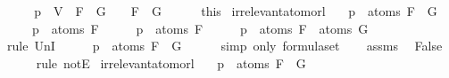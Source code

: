 \begin{isabellebody}
\ \ \isamarkupfalse%
\ \isamarkupfalse%
\ {\isachardoublequoteopen}{\isasymA}{\isacharparenleft}p\ {\isacharcolon}{\isacharequal}\ V{\isacharparenright}\ {\isasymTurnstile}\ {\isacharparenleft}F\ \isactrlbold {\isasymand}\ G{\isacharparenright}\ {\isasymlongleftrightarrow}\ {\isasymA}\ {\isasymTurnstile}\ {\isacharparenleft}F\ \isactrlbold {\isasymand}\ G{\isacharparenright}{\isachardoublequoteclose}\isanewline
\ \ \ \ \isamarkupfalse%
\ this\isanewline
{}\isamarkupfalse%
%
\endisatagproof
{\isafoldproof}%
%
\isadelimproof
\isanewline
%
\endisadelimproof
\isanewline
{}\isamarkupfalse%
\ irrelevant{\isacharunderscore}atom{\isacharunderscore}or{\isacharunderscore}l{}{\isacharcolon}\isanewline
\ \ \ {\isachardoublequoteopen}p\ {\isasymnotin}\ atoms\ {\isacharparenleft}F\ \isactrlbold {\isasymor}\ G{\isacharparenright}{\isachardoublequoteclose}\isanewline
\ \ \ \ \ {\isachardoublequoteopen}p\ {\isasymnotin}\ atoms\ F{\isachardoublequoteclose}\isanewline
%
\isadelimproof
%
\endisadelimproof
%
\isatagproof
{}\isamarkupfalse%
\ \isanewline
\ \ \isamarkupfalse%
\ {\isachardoublequoteopen}p\ {\isasymin}\ atoms\ F{\isachardoublequoteclose}\isanewline
\ \ \isamarkupfalse%
\ \isamarkupfalse%
\ {\isachardoublequoteopen}p\ {\isasymin}\ atoms\ F\ {\isasymunion}\ atoms\ G{\isachardoublequoteclose}\isanewline
\ \ \ \ \isamarkupfalse%
\ {\isacharparenleft}rule\ UnI{}{\isacharparenright}\isanewline
\ \ \isamarkupfalse%
\ \isamarkupfalse%
\ {\isachardoublequoteopen}p\ {\isasymin}\ atoms\ {\isacharparenleft}F\ \isactrlbold {\isasymor}\ G{\isacharparenright}{\isachardoublequoteclose}\isanewline
\ \ \ \ \isamarkupfalse%
\ {\isacharparenleft}simp\ only{\isacharcolon}\ formula{\isachardot}set{\isacharparenleft}{}{\isacharparenright}{\isacharparenright}\isanewline
\ \ \isamarkupfalse%
\ assms\ \isamarkupfalse%
\ False\ \isanewline
\ \ \ \ \isamarkupfalse%
\ {\isacharparenleft}rule\ notE{\isacharparenright}\isanewline
{}\isamarkupfalse%
%
\endisatagproof
{\isafoldproof}%
%
\isadelimproof
\isanewline
%
\endisadelimproof
\isanewline
{}\isamarkupfalse%
\ irrelevant{\isacharunderscore}atom{\isacharunderscore}or{\isacharunderscore}l{}{\isacharcolon}\isanewline
\ \ \ {\isachardoublequoteopen}p\ {\isasymnotin}\ atoms\ {\isacharparenleft}F\ \isactrlbold {\isasymor}\ G{\isacharparenright}{\isachardoublequoteclose}\isanewline

\end{isabellebody}
